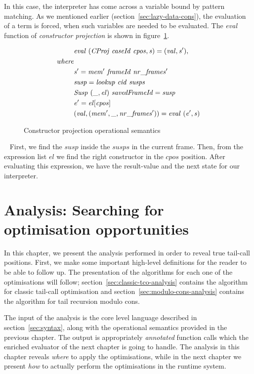 \documentclass[diploma]{softlab-thesis}
\begin{document}
In this case, the interpreter has come across a variable bound by 
pattern matching. As we mentioned earlier (section~\ref{sec:lazy-data-cons}), the evaluation
of a term is forced, when such variables are needed to be evaluated.
The \textit{eval} function of \textit{constructor projection} is shown in 
figure~\ref{fig:consproj}. ~
\begin{figure}[htp]
  \begin{align*}
    & \mathit{eval \hfill\ (CProj \hfill\ caseId \hfill\ cpos, s) = (val, s'),} \\
    \mathit{where } \\
    & \mathit{s' = mem' \hfill\ frameId \hfill\ nr\_frames'} \\
    & \mathit{susp = lookup \hfill\ cid \hfill\ susps} \\
    & \mathit{Susp \hfill\ (\_, el) \hfill\ savedFrameId = susp} \\
    & \mathit{e' = el[cpos]} \\
    & \mathit{(val, (mem', \_, nr\_frames')) = eval \hfill\ (e', s)}
  \end{align*}
\caption{Constructor projection operational semantics\label{fig:consproj}}
\end{figure} ~
First, we find the $\mathit{susp}$ inside the $\mathit{susps}$ in the current frame. Then, 
from the expression list $\mathit{el}$ we find the right constructor in the $\mathit{cpos}$ 
position. After evaluating this expression, we have the result-value and the next state 
for our interpreter.

\chapter{Analysis: Searching for optimisation opportunities}
\label{ch:analysis}

In this chapter, we present the analysis performed in order to reveal true tail-call positions.
First, we make some important high-level definitions for the reader to be able to follow up. 
The presentation of the algorithms for each one of the optimisations will follow; section~\ref{sec:classic-tco-analysis} contains 
the algorithm for classic tail-call optimisation and section~\ref{sec:modulo-cons-analysis} contains the algorithm for tail recursion modulo cons.
\newline
\par The input of the analysis is the core level language described in section~\ref{sec:syntax}, 
along with the operational semantics provided in the previous chapter. The output is appropriately 
\textit{annotated} function calls which the enriched evaluator of the next chapter is going to handle.
The analysis in this chapter reveals \textit{where} to apply the optimisations, while 
in the next chapter we present \textit{how} to actually perform the optimisations in the runtime system.
\end{document}
